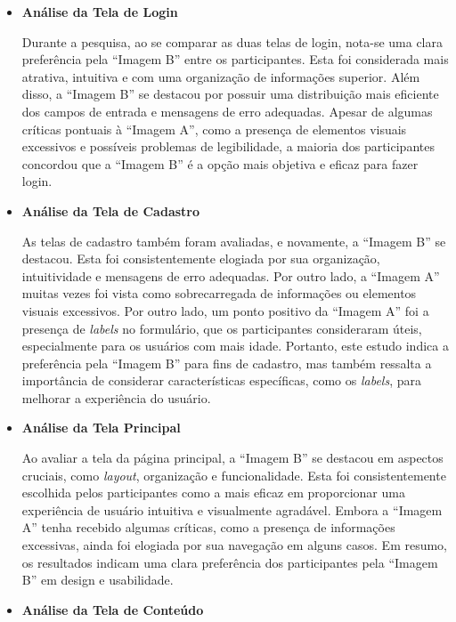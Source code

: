 \begin{itemize}
    \item \textbf{Análise da Tela de Login}
    
    Durante a pesquisa, ao se comparar as duas telas de login, nota-se uma clara preferência pela ``Imagem B'' entre os participantes. Esta foi considerada mais atrativa, intuitiva e com uma organização de informações superior. Além disso, a ``Imagem B'' se destacou por possuir uma distribuição mais eficiente dos campos de entrada e mensagens de erro adequadas. Apesar de algumas críticas pontuais à ``Imagem A'', como a presença de elementos visuais excessivos e possíveis problemas de legibilidade, a maioria dos participantes concordou que a ``Imagem B'' é a opção mais objetiva e eficaz para fazer login.
    
    \item \textbf{Análise da Tela de Cadastro}
    
    As telas de cadastro também foram avaliadas, e novamente, a ``Imagem B'' se destacou. Esta foi consistentemente elogiada por sua organização, intuitividade e mensagens de erro adequadas. Por outro lado, a ``Imagem A'' muitas vezes foi vista como sobrecarregada de informações ou elementos visuais excessivos. Por outro lado, um ponto positivo da ``Imagem A'' foi a presença de \textit{labels} no formulário, que os participantes consideraram úteis, especialmente para os usuários com mais idade. Portanto, este estudo indica a preferência pela ``Imagem B'' para fins de cadastro, mas também ressalta a importância de considerar características específicas, como os \textit{labels}, para melhorar a experiência do usuário.
    
    \item \textbf{Análise da Tela Principal}
    
    Ao avaliar a tela da página principal, a ``Imagem B'' se destacou em aspectos cruciais, como \textit{layout}, organização e funcionalidade. Esta foi consistentemente escolhida pelos participantes como a mais eficaz em proporcionar uma experiência de usuário intuitiva e visualmente agradável. Embora a ``Imagem A'' tenha recebido algumas críticas, como a presença de informações excessivas, ainda foi elogiada por sua navegação em alguns casos. Em resumo, os resultados indicam uma clara preferência dos participantes pela ``Imagem B'' em design e usabilidade.

    \item \textbf{Análise da Tela de Conteúdo}
    

\end{itemize}

